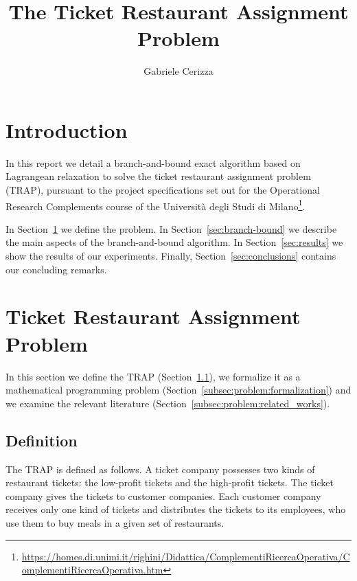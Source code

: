 \documentclass[runningheads]{llncs}
\begin{document}
\title{
  The Ticket Restaurant Assignment Problem
}
\author{Gabriele Cerizza}


\maketitle

\section*{Introduction}
\label{sec:introduction}

In this report we detail a branch-and-bound exact algorithm based on Lagrangean relaxation to solve the ticket restaurant assignment problem (TRAP), pursuant to the project specifications set out for the Operational Research Complements course of the Università degli Studi di Milano\footnote{\url{https://homes.di.unimi.it/righini/Didattica/ComplementiRicercaOperativa/ComplementiRicercaOperativa.htm}}. 

In Section~\ref{sec:problem} we define the problem. In Section~\ref{sec:branch-bound} we describe the main aspects of the branch-and-bound algorithm. In Section~\ref{sec:results} we show the results of our experiments. Finally, Section~\ref{sec:conclusions} contains our concluding remarks.

\section{Ticket Restaurant Assignment Problem}
\label{sec:problem}

In this section we define the TRAP (Section~\ref{subsec:problem:definition}), we formalize it as a mathematical programming problem (Section~\ref{subsec:problem:formalization}) and we examine the relevant literature (Section~\ref{subsec:problem:related_works}).

\subsection{Definition}
\label{subsec:problem:definition}

The TRAP is defined as follows. A ticket company possesses two kinds of restaurant tickets: the low-profit tickets and the high-profit tickets. The ticket company gives the tickets to customer companies. Each customer company receives only one kind of tickets and distributes the tickets to its employees, who use them to buy meals in a given set of restaurants.
\end{document}
